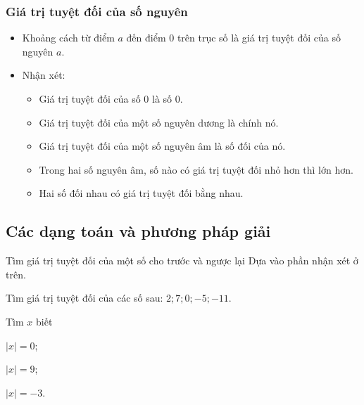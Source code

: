 \subsubsection{Giá trị tuyệt đối của số nguyên}
\begin{itemize}
\item Khoảng cách từ điểm $a$ đến điểm $0$ trên trục số là giá trị tuyệt đối của số nguyên $a$.
\item Nhận xét:
\begin{itemize}
\item Giá trị tuyệt đối của số $0$ là số $0$.
\item Giá trị tuyệt đối của một số nguyên dương là chính nó.
\item Giá trị tuyệt đối của một số nguyên âm là số đối của nó.
\item Trong hai số nguyên âm, số nào có giá trị tuyệt đối nhỏ hơn thì lớn hơn.
\item Hai số đối nhau có giá trị tuyệt đối bằng nhau.
\end{itemize}
\end{itemize}
\subsection{Các dạng toán và phương pháp giải}
\begin{dang}{Tìm giá trị tuyệt đối của một số cho trước và ngược lại}
Dựa vào phần nhận xét ở trên.
\end{dang}

\begin{vd}%
Tìm giá trị tuyệt đối của các số sau:
$2; 7; 0; -5; -11.$
\end{vd}

\begin{vd}%
Tìm $x$ biết
\begin{enumEX}{3}
\item $|x|=0$;
\item $|x|=9$;
\item $|x|=-3$.
\end{enumEX}
\end{vd}

